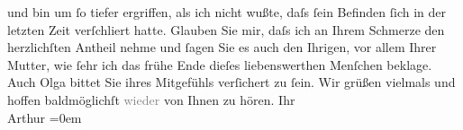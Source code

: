 \begin{ledgroupsized}[t]{13cm}
               und bin um ſo tiefer ergriffen, als ich nicht wußte, daſs ſein Befinden ſich in der
               letzten Zeit verſchli{\geminationm}ert hatte. Glauben Sie mir, daſs
               ich an Ihrem Schmerze den herzlichſten Antheil nehme und ſagen Sie es auch den
               Ihrigen, vor allem Ihrer Mutter, wie ſehr ich das {\pb}frühe Ende
               dieſes liebenswerthen Menſchen beklage. Auch Olga bittet Sie
               ihres Mitgefühls verſichert zu ſein. Wir grüßen vielmals und hoffen baldmöglichſt
                  \textcolor{gray}{wieder} von Ihnen zu hören.\pend
           \pstart
           Ihr {\\[\baselineskip]}\spacefill\mbox{Arthur}\pend
           \leftskip=0em{}
         
         \endnumbering{}\end{ledgroupsized}  \newcommand{\dateiname}{L03014}\newcommand{\titel}{Arthur Schnitzler an Felix Salten, 29. 6. 1908}\newcommand{\editorInnen}{Martin Anton Müller und Laura Untner}
      